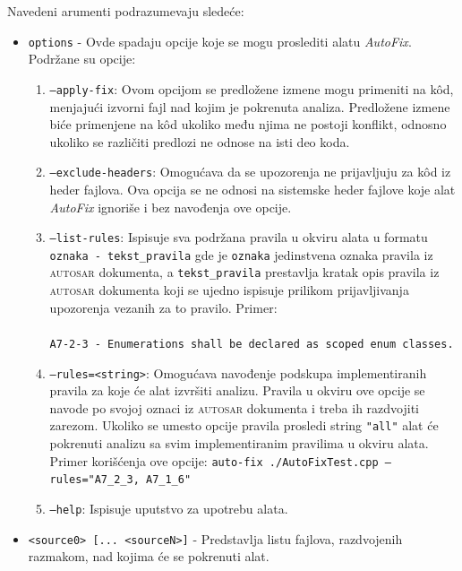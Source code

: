\documentclass[12pt,oneside]{memoir}
\begin{document}
Navedeni arumenti podrazumevaju sledeće:
\begin{itemize}
  \item \texttt{options} - Ovde spadaju opcije koje se mogu proslediti alatu \textit{AutoFix}. Podr\v{z}ane su opcije:
  \begin{enumerate}
    \item \texttt{--apply-fix}: Ovom opcijom se predlo\v{z}ene izmene mogu primeniti na k\^{o}d, menjaju\'{c}i izvorni fajl nad kojim je pokrenuta analiza.
    Predlo\v{z}ene izmene bi\'{c}e primenjene na k\^{o}d ukoliko među njima ne postoji konflikt, odnosno ukoliko se razli\v{c}iti predlozi ne odnose na isti deo koda.
    \item \texttt{--exclude-headers}: Omogu\'{c}ava da se upozorenja ne prijavljuju za k\^{o}d iz heder fajlova. Ova opcija se ne odnosi na sistemske
      heder fajlove koje alat \textit{AutoFix} ignori\v{s}e i bez navođenja ove opcije.
    \item \texttt{--list-rules}: Ispisuje sva podr\v{z}ana pravila u okviru alata u formatu \texttt{oznaka - tekst\_pravila} gde je \texttt{oznaka} jedinstvena oznaka pravila iz \textsc{autosar} dokumenta, a \texttt{tekst\_pravila} prestavlja kratak opis pravila iz \textsc{autosar} dokumenta koji se ujedno ispisuje prilikom prijavljivanja upozorenja vezanih za to pravilo. Primer: \\ \\
  \texttt{A7-2-3 - Enumerations shall be declared as scoped enum classes.} \\
    \item \texttt{--rules=<string>}: Omogu\'{c}ava navođenje podskupa implementiranih pravila za koje \'{c}e alat izvr\v{s}iti analizu. Pravila u okviru ove opcije
    se navode po svojoj oznaci iz \textsc{autosar} dokumenta i treba ih razdvojiti zarezom. Ukoliko se umesto opcije pravila prosledi string \texttt{"all"} alat \'{c}e pokrenuti
    analizu sa svim implementiranim pravilima u okviru alata. Primer kori\v{s}\'{c}enja ove opcije: \newline\newline
    \texttt{auto-fix ./AutoFixTest.cpp --rules="A7\_2\_3, A7\_1\_6"} \\
    \item \texttt{--help}: Ispisuje uputstvo za upotrebu alata.
  \end{enumerate}

\item \texttt{<source0> [... <sourceN>]} - Predstavlja listu fajlova, razdvojenih razmakom, nad kojima \'{c}e se pokrenuti alat.

\end{itemize}
\end{document}
